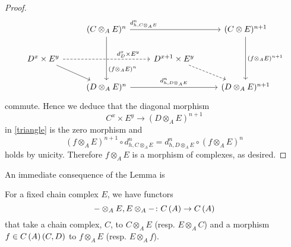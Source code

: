 \documentclass[dissertation.tex]{subfiles}
\begin{document}
\begin{lem}
\begin{proof}
$$\begin{tikzcd}
      & (C \otimes_A E)^n \arrow[pos=0.15]{rr}{d^n_{h,C \otimes_A E}}\arrow[pos=0.75]{dd}{(f \otimes_A E)^n} & & (C \otimes E)^{n+1}\arrow{dd}{(f \otimes_A E)^{n+1}}\\
      D^x \times E^y \arrow[pos=0.75,dashed]{rr}{d^x_D \times E^y}\arrow{rd}& & D^{x + 1} \times E^y\arrow[dashed]{rd}\\
      & (D \otimes_A E)^n \arrow{rr}{d^n_{h,D \otimes_A E}} & & (D \otimes_A E)^{n+1}
    \end{tikzcd}$$
    commute.
    Hence we deduce that the diagonal morphism
    $$C^x \times E^y \to (D \otimes_A E)^{n+1}$$
    in \ref{triangle}
    is the zero morphism and
    $$(f \otimes_A E)^{n+1} \circ d^n_{h,C \otimes_A E} = d^n_{h,D \otimes_A E} \circ (f \otimes_A E)^n$$
    holds by unicity.
    Therefore $f \otimes_A E$ is a morphism of complexes, as desired.
  \end{proof}
\end{lem}

An immediate consequence of the Lemma is
\begin{cor}
  For a fixed chain complex $E$, we have functors
  $$- \otimes_A E, E \otimes_A - \colon C\left(A\right) \to C\left(A\right)$$
  that take a chain complex, $C$, to $C \otimes_A E$ (resp. $E \otimes_A C$) and a morphism $f \in C\left(A\right)(C,D)$ to $f \otimes_A E$ (resp. $E \otimes_A f$).
\end{cor}
\end{document}

